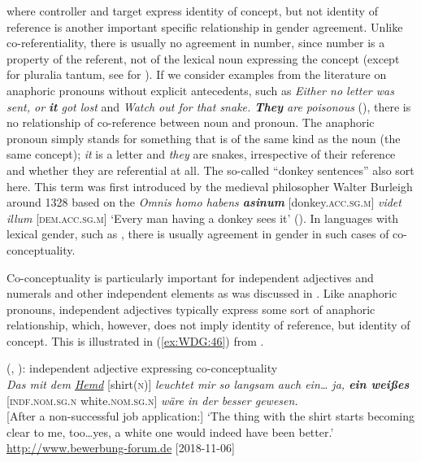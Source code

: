 \documentclass[output=collectionpaper]{langsci/langscibook}
\begin{document}
 \textendash{} where controller and target express identity of concept, but not identity of reference \textendash{} is another important specific relationship in gender agreement. Unlike co-referentiality, there is usually no agreement in number, since number is a property of the referent, not of the lexical noun expressing the concept (except for pluralia tantum, see \citealt{Waelchli2017} for ). If we consider examples from the literature on anaphoric pronouns without explicit antecedents, such as \textit{Either no letter was sent, or \textbf{it} got lost} and \textit{Watch out for that snake. \textbf{They} are poisonous} (\citealt[211]{Bosch1988}), there is no relationship of co-reference between noun and pronoun. The anaphoric pronoun simply stands for something that is of the same kind as the noun (the same concept); \textit{it} is a letter and \textit{they} are snakes, irrespective of their reference and whether they are referential at all. The so-called ``donkey sentences'' also sort here. This term was first introduced by the medieval philosopher Walter Burleigh around 1328 based on the  \textit{Omnis homo habens \textbf{asinum}} [donkey.\textsc{acc.sg.m}] \textit{videt illum} [\textsc{dem.acc.sg.m}] `Every man having a donkey sees it' (\citealt[269]{Seuren2009}). In languages with lexical gender, such as , there is usually agreement in gender in such cases of co-conceptuality.

Co-conceptuality is particularly important for independent adjectives and numerals and other independent elements as was discussed in . Like anaphoric pronouns, independent adjectives typically express some sort of anaphoric relationship, which, however, does not imply identity of reference, but identity of concept. This is illustrated in (\ref{ex:WDG:46}) from .

\ea\label{ex:WDG:46}
 (, ): independent adjective expressing co-conceptuality\\
\textit{Das mit dem \uline{Hemd}} [shirt(\textsc{n})] \textit{leuchtet mir so langsam auch ein{\dots} ja, \textbf{ein weißes}} [\textsc{indf.nom.sg.n} white.\textsc{nom.sg.n}] \textit{wäre in der  besser gewesen.}\\
{[}After a non-successful job application:{]} `The thing with the shirt starts becoming clear to me, too{\dots}yes, a white one would indeed have been better.'\\
\url{http://www.bewerbung-forum.de} [2018-11-06] \\
\z
\end{document}
